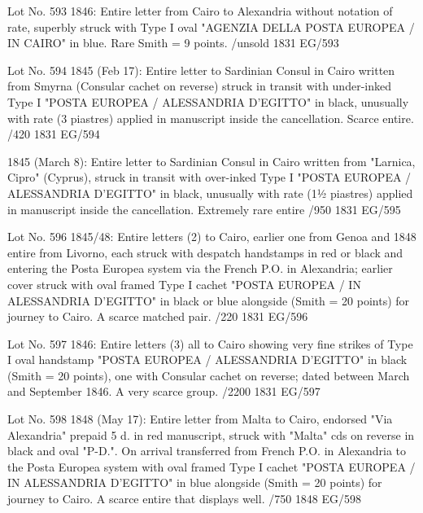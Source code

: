 \documentclass[justified]{tufte-book}
\begin{document}
%
{
Lot No. 593
1846: Entire letter from Cairo to Alexandria without notation of rate, superbly struck with Type I oval "AGENZIA DELLA POSTA EUROPEA / IN CAIRO" in blue. Rare Smith = 9 points. /unsold }%
{1831}%
{EG/593}%
{}%
{}
{}%
{}


%
{
Lot No. 594
1845 (Feb 17): Entire letter to Sardinian Consul in Cairo written from Smyrna (Consular cachet on reverse) struck in transit with under-inked Type I "POSTA EUROPEA / ALESSANDRIA D'EGITTO" in black, unusually with rate (3 piastres) applied in manuscript inside the cancellation. Scarce entire. /420 }%
{1831}%
{EG/594}%
{}%
{}
{}%
{}



%
{1845 (March 8): Entire letter to Sardinian Consul in Cairo written from "Larnica, Cipro" (Cyprus), struck in transit with over-inked Type I "POSTA EUROPEA / ALESSANDRIA D'EGITTO" in black, unusually with rate (1½ piastres) applied in manuscript inside the cancellation. Extremely rare entire 
/950 
}%
{1831}%
{EG/595}%
{}%
{}
{}%
{}



%
{
Lot No. 596
1845/48: Entire letters (2) to Cairo, earlier one from Genoa and 1848 entire from Livorno, each struck with despatch handstamps in red or black and entering the Posta Europea system via the French P.O. in Alexandria; earlier cover struck with oval framed Type I cachet "POSTA EUROPEA / IN ALESSANDRIA D'EGITTO" in black or blue alongside (Smith = 20 points) for journey to Cairo. A scarce matched pair. 
 /220 
}%
{1831}%
{EG/596}%
{}%
{}
{}%
{}

%
{Lot No. 597
1846: Entire letters (3) all to Cairo showing very fine strikes of Type I oval handstamp "POSTA EUROPEA / ALESSANDRIA D'EGITTO" in black (Smith = 20 points), one with Consular cachet on reverse; dated between March and September 1846. A very scarce group. 
/2200 }%
{1831}%
{EG/597}%
{}%
{}
{}%
{}

%
{Lot No. 598
1848 (May 17): Entire letter from Malta to Cairo, endorsed "Via Alexandria" prepaid 5 d. in red manuscript, struck with "Malta" cds on reverse in black and oval "P-D.". On arrival transferred from French P.O. in Alexandria to the Posta Europea system with oval framed Type I cachet "POSTA EUROPEA / IN ALESSANDRIA D'EGITTO" in blue alongside (Smith = 20 points) for journey to Cairo. A scarce entire that displays well. /750 }%
{1848}%
{EG/598}%
{}%
{}
{}%
{}
\end{document}
